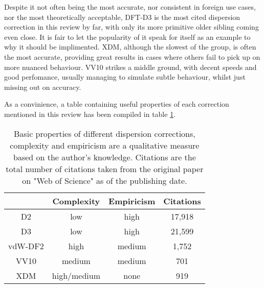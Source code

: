 \documentclass[10pt,a4paper,twocolumn,twoside]{extarticle}
\begin{document}
	Despite it not often being the most accurate, nor consistent in foreign use cases, nor the most theoretically acceptable, DFT-D3 is the most cited dispersion correction in this review by far, with only its more primitive older sibling coming even close. It is fair to let the popularity of it speak for itself as an example to why it should be implimented. XDM, although the slowest of the group, is often the most accurate, providing great results in cases where others fail to pick up on more nuanced behaviour. VV10 strikes a middle ground, with decent speeds and good perfomance, usually managing to simulate subtle behaviour, whilst just missing out on accuracy. 

	As a convinience, a table containing useful properties of each correction mentioned in this review has been compiled in table \ref{tab:conc}. 

	\begin{table}
		\begin{tabular}{c|c c c}
			& Complexity & Empiricism & Citations \\
			\hline
			D2 & low & high & 17,918\\
			D3 & low & high & 21,599\\
			vdW-DF2 & high & medium  & 1,752\\
			VV10 & medium & medium & 701\\
			XDM & high/medium & none & 919\\
		\end{tabular}
		\caption{Basic properties of different dispersion corrections, complexity and empiricism are a qualitative measure based on the author's knowledge. Citations are the total number of citations taken from the original paper on "Web of Science" as of the publishing date.}
		\label{tab:conc}
	\end{table}


	\newpage
	\printbibliography
	
\end{document}
